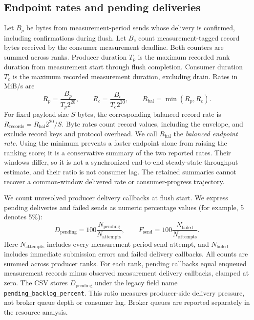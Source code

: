 \documentclass[10pt]{article}
\begin{document}
\subsection{Endpoint rates and pending deliveries}

Let $B_p$ be bytes from measurement-period sends whose delivery is confirmed,
including confirmations during flush.  Let $B_c$ count measurement-tagged
record bytes received by the consumer measurement deadline.  Both counters
are summed across ranks.  Producer duration $T_p$ is the maximum recorded rank duration
from measurement start through flush completion.  Consumer duration $T_c$ is the
maximum recorded measurement duration, excluding drain.  Rates in MiB/s are
\begin{equation}
 R_p=\frac{B_p}{T_p2^{20}},\qquad
 R_c=\frac{B_c}{T_c2^{20}},\qquad
 R_{\mathrm{bal}}=\min(R_p,R_c).
 \label{eq:balanced-throughput}
\end{equation}
For fixed payload size $S$ bytes, the corresponding balanced record rate is
$R_{\mathrm{records}}=R_{\mathrm{bal}}2^{20}/S$.
Byte rates count record values, including the envelope, and exclude record keys
and protocol overhead.  We call $R_{\mathrm{bal}}$ the \emph{balanced endpoint rate}.
Using the minimum prevents a faster endpoint alone from raising the ranking
score; it is a conservative summary of the two reported rates.  Their windows
differ, so it is not a synchronized end-to-end steady-state throughput estimate,
and their ratio is not consumer lag.  The retained summaries cannot recover a
common-window delivered rate or consumer-progress trajectory.

We count unresolved producer delivery callbacks at flush start.
We express pending deliveries and failed sends as numeric
percentage values (for example, 5 denotes 5\%):
\begin{equation}
 D_{\mathrm{pending}}=100\frac{N_{\mathrm{pending}}}{N_{\mathrm{attempts}}},
 \qquad
 F_{\mathrm{send}}=100\frac{N_{\mathrm{failed}}}{N_{\mathrm{attempts}}}.
 \label{eq:pending-delivery}
\end{equation}
Here $N_{\mathrm{attempts}}$ includes every measurement-period send attempt,
and $N_{\mathrm{failed}}$ includes immediate submission errors and failed delivery
callbacks.  All counts are summed across producer ranks.  For each rank, pending
callbacks equal enqueued measurement records minus observed measurement delivery
callbacks, clamped at zero.  The CSV stores
$D_{\mathrm{pending}}$ under the legacy field name \texttt{pending\_backlog\_percent}.
This ratio measures producer-side delivery pressure, not broker queue depth or consumer
lag.  Broker queues are reported separately in the resource analysis.
\end{document}
